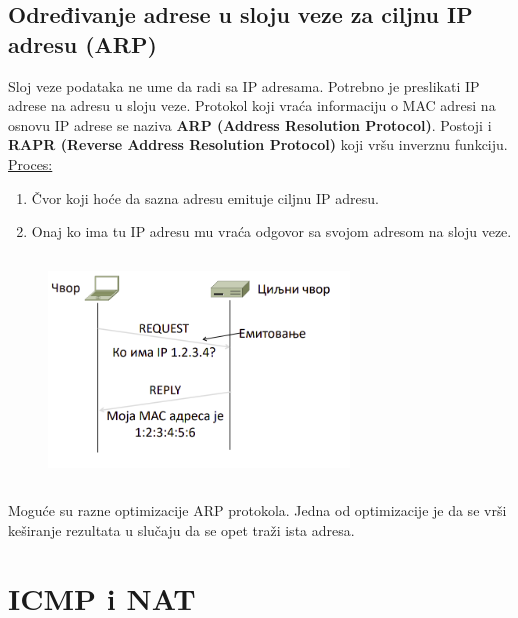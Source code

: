 \documentclass[a4paper]{article}
\begin{document}
    \subsection{Određivanje adrese u sloju veze za ciljnu IP adresu (ARP)}
        Sloj veze podataka ne ume da radi sa IP adresama. Potrebno je preslikati IP adrese 
        na adresu u sloju veze. Protokol koji vraća informaciju o MAC adresi na osnovu
        IP adrese se naziva \textbf{ARP (Address Resolution Protocol)}. Postoji i
        \textbf{RAPR (Reverse Address Resolution Protocol)} koji vršu inverznu funkciju. \\
        \noindent \underline{Proces:}
        \begin{enumerate}
            \item Čvor koji hoće da sazna adresu emituje ciljnu IP adresu.
            \item Onaj ko ima tu IP adresu mu vraća odgovor sa svojom adresom na sloju veze.
        \end{enumerate}
        \begin{figure}[H]
            \begin{center}
                \includegraphics[width=80mm,height=60mm]{Slike/arp.png}
            \end{center}
        \end{figure}
        Moguće su razne optimizacije ARP protokola. Jedna od optimizacije je da se 
        vrši keširanje rezultata u slučaju da se opet traži ista adresa.
        
\section{ICMP i NAT}
\end{document}
